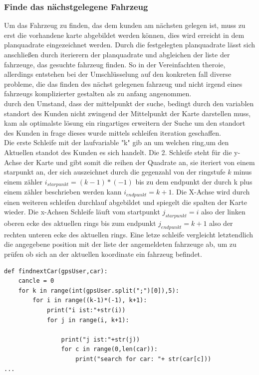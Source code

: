 \documentclass[conference]{IEEEtran}
\begin{document}
\subsubsection{Finde das nächstgelegene Fahrzeug}
Um das Fahrzeug  zu finden,  das dem kunden am nächsten  gelegen ist, muss zu erst die vorhandene karte abgebildet werden können, dies wird erreicht in dem planquadrate eingezeichnet werden. Durch die festgelegten planquadrate lässt sich anschließen durch iterierern der planquadrate und abgleichen der liste der fahrzeuge, das gesuchte fahrzeug finden. So in der Vereinfachten theroie, allerdings entstehen bei der Umschlüsselung auf den konkreten fall diverse probleme, die das finden des nächst gelegenen fahrzeug und nicht irgend eines fahrzeugs komplizierter gestalten als zu anfang angenommen.\\
durch den Umstand, dass der mittelpunkt der suche, bedingt durch den variablen standort des Kunden nicht zwingend der Mittelpunkt der Karte darstellen muss, kam als optimalste lösung ein ringartiges erweitern der Suche um den standort des Kunden in frage dieses wurde mittels schleifen iteration geschaffen.\\
Die erste Schleife mit der laufvariable "k" gib an um welchen ring,um den Aktuellen standot des Kunden es sich handelt. Die 2. Schleife steht für die y-Achse der Karte und gibt somit die reihen der Quadrate an, sie iteriert von einem starpunkt an, der sich auszeichnet durch die gegenzahl von der ringstufe $k$ minus einem zähler $i_{starpunkt} = (k-1)*(-1)$ bis zu dem endpunkt der durch k plus einem zähler beschrieben werden kann $i_{endpunkt} = k+1$. Die X-Achse wird durch einen weiteren schleifen durchlauf abgebildet und spiegelt die spalten der Karte wieder. Die x-Achsen Schleife läuft vom startpunkt $j_{starpunkt} = i $ also der linken oberen ecke des aktuellen rings bis zum endpunkt $j_{endpunkt} = k+1$ also der rechten unteren ecke des aktuellen rings. Eine letze schleife vergleicht letztendlich die angegebene position mit der liste der angemeldeten fahrzeuge ab, um zu prüfen ob sich an der aktuellen koordinate ein fahrzeug befindet. 
\begin{lstlisting}
def findnextCar(gpsUser,car):
    cancle = 0
    for k in range(int(gpsUser.split(";")[0]),5):
        for i in range((k-1)*(-1), k+1):
            print("i ist:"+str(i))
            for j in range(i, k+1):

                print("j ist:"+str(j))
                for c in range(0,len(car)):
                    print("search for car: "+ str(car[c]))
...
\end{lstlisting}
\end{document}
